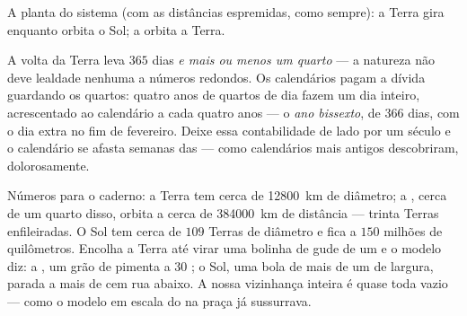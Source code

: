 \begin{omfigure}

{\small A planta do sistema (com as distâncias espremidas, como
sempre): a Terra gira enquanto orbita o Sol; a  orbita a Terra.}
\end{omfigure}

\begin{example}\label{ex:g6:sun-earth-moon:leap}
A volta da Terra leva $365$ dias \emph{e mais ou menos um quarto} ---
a natureza não deve lealdade nenhuma a números redondos. Os
calendários pagam a dívida guardando os quartos: quatro anos de
quartos de dia fazem um dia inteiro, acrescentado ao calendário a
cada quatro anos --- o \emph{ano bissexto}, de $366$ dias, com o dia
extra no fim de fevereiro. Deixe essa contabilidade de lado por um
século e o calendário se afasta semanas das  --- como
calendários mais antigos descobriram, dolorosamente.
\end{example}

\begin{example}\label{ex:g6:sun-earth-moon:scale}
Números para o caderno: a Terra tem cerca de \qty{12800}{km} de
diâmetro; a , cerca de um quarto disso, orbita a cerca de
\qty{384000}{km} de distância --- trinta Terras enfileiradas. O Sol
tem cerca de $109$ Terras de diâmetro e fica a $150$ milhões de
quilômetros. Encolha a Terra até virar uma bolinha de gude de um
 e o modelo diz: a , um grão de pimenta a $30$
; o Sol, uma bola de mais de um  de largura, parada a
mais de cem  rua abaixo. A nossa vizinhança inteira é quase
toda vazio --- como o modelo em escala do  na praça já
sussurrava.
\end{example}

